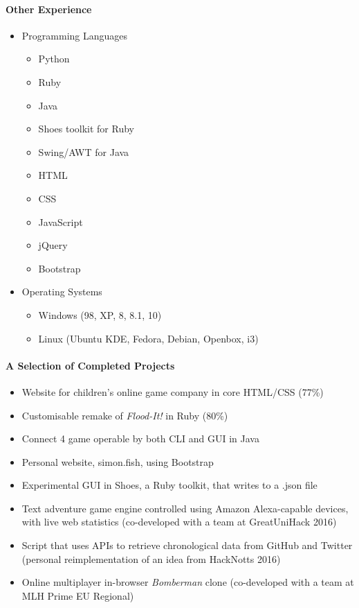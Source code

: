 \documentclass{article}
\begin{document}
\paragraph{Other Experience}
\begin{itemize}
	\item Programming Languages
	      \begin{multicols}{2}
		      \begin{itemize}
			      \item Python
			      \item Ruby
			      \item Java
			      \item Shoes toolkit for Ruby
			      \item Swing/AWT for Java
			      \item HTML
			      \item CSS
			      \item JavaScript
			      \item jQuery
			      \item Bootstrap
		      \end{itemize}
	      \end{multicols}
\end{itemize}
\begin{itemize}
	\item Operating Systems
	      \begin{itemize}
		      \item Windows (98, XP, 8, 8.1, 10)
		      \item Linux (Ubuntu KDE, Fedora, Debian, Openbox, i3)
	      \end{itemize}
\end{itemize}
\paragraph{A Selection of Completed Projects}
\begin{itemize}
	\item Website for children's online game company in core HTML/CSS (77\%)
	\item Customisable remake of \textit{Flood-It!} in Ruby (80\%)
	\item Connect 4 game operable by both CLI and GUI in Java
	\item Personal website, simon.fish, using Bootstrap
	\item Experimental GUI in Shoes, a Ruby toolkit, that writes to a .json file
	\item Text adventure game engine controlled using Amazon Alexa-capable devices, with live web statistics (co-developed with a team at GreatUniHack 2016)
	\item Script that uses APIs to retrieve chronological data from GitHub and Twitter (personal reimplementation of an idea from HackNotts 2016)
	\item Online multiplayer in-browser \textit{Bomberman} clone (co-developed with a team at MLH Prime EU Regional)
\end{itemize}
\end{document}
